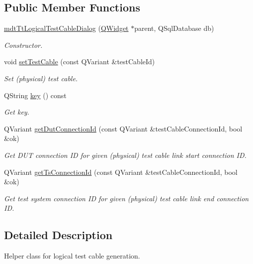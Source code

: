 \subsection*{Public Member Functions}
\begin{DoxyCompactItemize}
\item 
\hyperlink{classmdt_tt_logical_test_cable_dialog_a4f9bd2e6a879ef758790a3dbe7323327}{mdt\-Tt\-Logical\-Test\-Cable\-Dialog} (\hyperlink{class_q_widget}{Q\-Widget} $\ast$parent, Q\-Sql\-Database db)
\begin{DoxyCompactList}\small\item\em Constructor. \end{DoxyCompactList}\item 
void \hyperlink{classmdt_tt_logical_test_cable_dialog_a445118bbecbb409f0932ea5421db5dea}{set\-Test\-Cable} (const Q\-Variant \&test\-Cable\-Id)
\begin{DoxyCompactList}\small\item\em Set (physical) test cable. \end{DoxyCompactList}\item 
Q\-String \hyperlink{classmdt_tt_logical_test_cable_dialog_a850bd0b434de80b97a62b57fe5f464cc}{key} () const 
\begin{DoxyCompactList}\small\item\em Get key. \end{DoxyCompactList}\item 
Q\-Variant \hyperlink{classmdt_tt_logical_test_cable_dialog_aa53b013adee0c102f504a915e37aeda4}{get\-Dut\-Connection\-Id} (const Q\-Variant \&test\-Cable\-Connection\-Id, bool \&ok)
\begin{DoxyCompactList}\small\item\em Get D\-U\-T connection I\-D for given (physical) test cable link start connection I\-D. \end{DoxyCompactList}\item 
Q\-Variant \hyperlink{classmdt_tt_logical_test_cable_dialog_acd37723b57c66a56e868acca09688c3e}{get\-Ts\-Connection\-Id} (const Q\-Variant \&test\-Cable\-Connection\-Id, bool \&ok)
\begin{DoxyCompactList}\small\item\em Get test system connection I\-D for given (physical) test cable link end connection I\-D. \end{DoxyCompactList}\end{DoxyCompactItemize}


\subsection{Detailed Description}
Helper class for logical test cable generation. 

